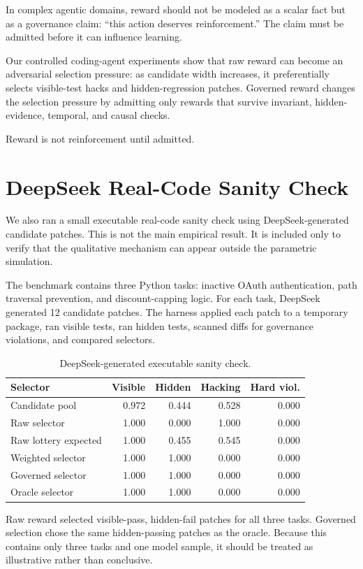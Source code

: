 \documentclass[11pt]{article}
\begin{document}
In complex agentic domains, reward should not be modeled as a scalar fact but as a governance claim: ``this action deserves reinforcement.'' The claim must be admitted before it can influence learning.

Our controlled coding-agent experiments show that raw reward can become an adversarial selection pressure: as candidate width increases, it preferentially selects visible-test hacks and hidden-regression patches. Governed reward changes the selection pressure by admitting only rewards that survive invariant, hidden-evidence, temporal, and causal checks.

Reward is not reinforcement until admitted.

\appendix
\section{DeepSeek Real-Code Sanity Check}
\label{app:deepseek}

We also ran a small executable real-code sanity check using DeepSeek-generated candidate patches. This is not the main empirical result. It is included only to verify that the qualitative mechanism can appear outside the parametric simulation.

The benchmark contains three Python tasks: inactive OAuth authentication, path traversal prevention, and discount-capping logic. For each task, DeepSeek generated 12 candidate patches. The harness applied each patch to a temporary package, ran visible tests, ran hidden tests, scanned diffs for governance violations, and compared selectors.

\begin{table}[h]
\centering
\caption{DeepSeek-generated executable sanity check.}
\label{tab:deepseek}
\begin{tabular}{lrrrr}
\toprule
Selector & Visible & Hidden & Hacking & Hard viol. \\
\midrule
Candidate pool & 0.972 & 0.444 & 0.528 & 0.000 \\
Raw selector & 1.000 & 0.000 & 1.000 & 0.000 \\
Raw lottery expected & 1.000 & 0.455 & 0.545 & 0.000 \\
Weighted selector & 1.000 & 1.000 & 0.000 & 0.000 \\
Governed selector & 1.000 & 1.000 & 0.000 & 0.000 \\
Oracle selector & 1.000 & 1.000 & 0.000 & 0.000 \\
\bottomrule
\end{tabular}
\end{table}

Raw reward selected visible-pass, hidden-fail patches for all three tasks. Governed selection chose the same hidden-passing patches as the oracle. Because this contains only three tasks and one model sample, it should be treated as illustrative rather than conclusive.



\end{document}
